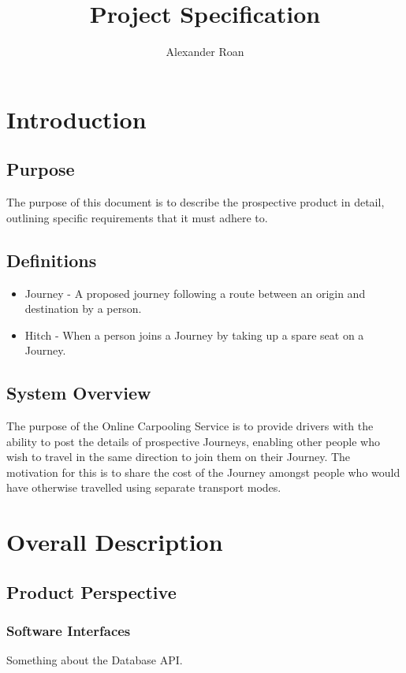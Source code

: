 \documentclass[11pt]{article}
\begin{document}
\begin{titlepage}
\title{Project Specification}
\author{Alexander Roan}
\maketitle
\end{titlepage}

\tableofcontents
\newpage
\section{Introduction}

\subsection{Purpose}
The purpose of this document is to describe the prospective product in detail, outlining specific requirements that it must adhere to.

\subsection{Definitions}
\begin{itemize}
\item Journey - A proposed journey following a route between an origin and destination by a person.
\item Hitch - When a person joins a Journey by taking up a spare seat on a Journey.
\end{itemize}

\subsection{System Overview}
The purpose of the Online Carpooling Service is to provide drivers with the ability to post the details of prospective Journeys, enabling other people who wish to travel in the same direction to join them on their Journey. The motivation for this is to share the cost of the Journey amongst people who would have otherwise travelled using separate transport modes.


\section{Overall Description}
\subsection{Product Perspective}
\subsubsection{Software Interfaces}
Something about the Database API.
\end{document}
